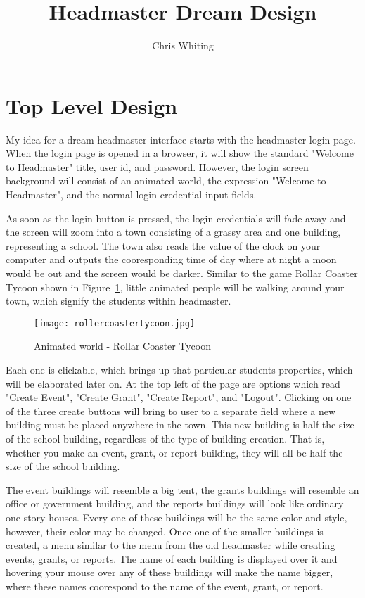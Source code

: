 \documentclass[11pt]{article}
\title{Headmaster Dream Design}
\author{Chris Whiting}
\begin{document}
\maketitle

 
\section{Top Level Design}
My idea for a dream headmaster interface starts with the headmaster login page. When the login page is opened in a browser, it will show the standard "Welcome to Headmaster" title, user id, and password. However, the login screen background will consist of an animated world, the expression "Welcome to Headmaster", and the normal login credential input fields.

As soon as the login button is pressed, the login credentials will fade away and the screen will zoom into a town consisting of a grassy area and one building, representing a school. The town also reads the value of the clock on your computer and outputs the cooresponding time of day where at night a moon would be out and the screen would be darker. Similar to the game Rollar Coaster Tycoon shown in Figure~\ref{RCT}, little animated people will be walking around your town, which signify the students within headmaster.

 \begin{figure}
\centering
\texttt{[image: rollercoastertycoon.jpg]}
\caption{Animated world - Rollar Coaster Tycoon}
\label{RCT}
\end{figure}

 Each one is clickable, which brings up that particular students properties, which will be elaborated later on. At the top left of the page are options which read "Create Event", "Create Grant", "Create Report", and "Logout". Clicking on one of the three create buttons will bring to user to a separate field where a new building must be placed anywhere in the town. This new building is half the size of the school building, regardless of the type of building creation. That is, whether you make an event, grant, or report building, they will all be half the size of the school building. 

The event buildings will resemble a big tent, the grants buildings will resemble an office or government building, and the reports buildings will look like ordinary one story houses. Every one of these buildings will be the same color and style, however, their color may be changed. Once one of the smaller buildings is created, a menu similar to the menu from the old headmaster while creating events, grants, or reports. The name of each building is displayed over it and hovering your mouse over any of these buildings will make the name bigger, where these names coorespond to the name of the event, grant, or report.
\end{document}
